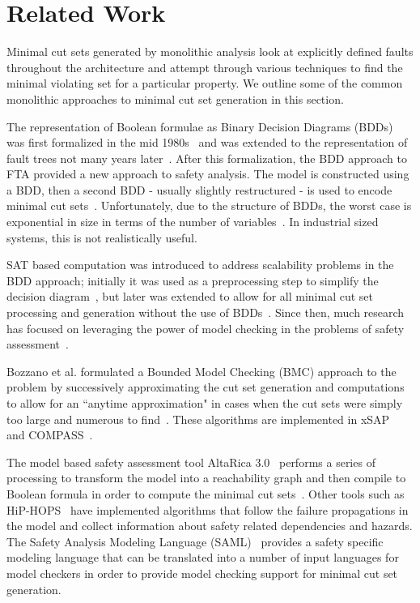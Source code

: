 \section{Related Work}
\label{sec:related_work}
Minimal cut sets generated by monolithic analysis look at explicitly defined faults throughout the architecture and attempt through various techniques to find the minimal violating set for a particular property. We outline some of the common monolithic approaches to minimal cut set generation in this section.

The representation of Boolean formulae as Binary Decision Diagrams (BDDs) was first formalized in the mid 1980s~\cite{bryant1986graph} and was extended to the representation of fault trees not many years later~\cite{rauzy1993new}. After this formalization, the BDD approach to FTA provided a new approach to safety analysis. The model is constructed using a BDD, then a second BDD - usually slightly restructured - is used to encode minimal cut sets~\cite{rauzy2008binary}. Unfortunately, due to the structure of BDDs, the worst case is exponential in size in terms of the number of variables~\cite{bryant1986graph,rauzy1993new,rauzy2008binary}. In industrial sized systems, this is not realistically useful. 

SAT based computation was introduced to address scalability problems in the BDD approach; initially it was used as a preprocessing step to simplify the decision diagram~\cite{bozzano2015safety}, but later was extended to allow for all minimal cut set processing and generation without the use of BDDs~\cite{bozzano2015efficient}. Since then, much research has focused on leveraging the power of model checking in the problems of safety assessment~\cite{bieber2002combination,schafer2003combining,bozzano2007symbolic,bozzano2003improving,volk2017fast,Joshi05:SafeComp,bozzano2015efficient,stewart2020safety}. 

Bozzano et al. formulated a Bounded Model Checking (BMC) approach to the problem by successively approximating the cut set generation and computations to allow for an ``anytime approximation" in cases when the cut sets were simply too large and numerous to find~\cite{bozzano2015efficient,mattarei2016scalable}. These algorithms are implemented in xSAP~\cite{DBLP:conf/tacas/BittnerBCCGGMMZ16} and COMPASS~\cite{compass30toolset}. 

The model based safety assessment tool AltaRica 3.0~\cite{prosvirnova:tel-01119730} performs a series of processing to transform the model into a reachability graph and then compile to Boolean formula in order to compute the minimal cut sets~\cite{prosvirnova2015automated}. Other tools such as HiP-HOPS~\cite{papadopoulos2001model} have implemented algorithms that follow the failure propagations in the model and collect information about safety related dependencies and hazards. The Safety Analysis Modeling Language (SAML)~\cite{Gudemann:2010:FQQ:1909626.1909813} provides a safety specific modeling language that can be translated into a number of input languages for model checkers in order to provide model checking support for minimal cut set generation.

